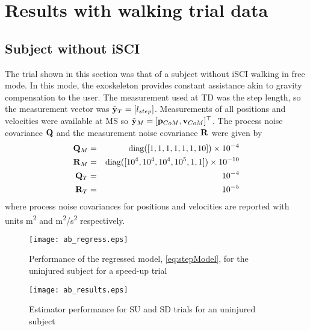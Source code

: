 \section{Results with walking trial data}

\subsection{Subject without iSCI}

The trial shown in this section was that of a subject without iSCI walking in free mode. In this mode, the exoskeleton provides constant assistance akin to gravity compensation to the user. The measurement used at TD was the step length, so the measurement vector was $ \tilde{\mathbf{y}}_{T} = [l_{step}] $. Measurements of all positions and velocities were available at MS so $ \tilde{\mathbf{y}}_{M} = [\mathbf{p}_{CoM} ,\mathbf{v}_{CoM}]^{\top} $. The process noise covariance $ \mathbf{Q} $ and the measurement noise covariance $ \mathbf{R} $ were given by
\begin{eqnarray}
	\Q_M &=& {\rm diag}([1 ,1 ,1 ,1 ,1 ,1 ,10]) \times 10^{-4} \\
	\R_M &=& {\rm diag}([10^{4} ,10^{4} ,10^{4} ,10^{5} ,1 ,1]) \times 10^{-10} \\ %
	\Q_T &=& 10^{-4} \\
	\R_T &=& 10^{-5} %
\end{eqnarray}
where process noise covariances for positions and velocities are reported with units m\textsuperscript{2} and m\textsuperscript{2}/s\textsuperscript{2} respectively.

\begin{figure}
	\centering
	\texttt{[image: ab\_regress.eps]}
	\caption{Performance of the regressed model, \eqref{eq:stepModel}, for the uninjured subject for a speed-up trial} \label{fig:ab_regressor}
\end{figure}

\begin{figure}
	\centering
	\texttt{[image: ab\_results.eps]}
	\caption{Estimator performance for SU and SD trials for an uninjured subject} \label{fig:ab_results}
\end{figure}

